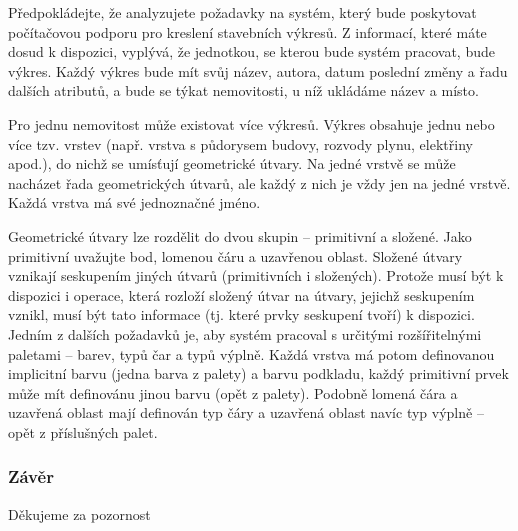 \documentclass{beamer}
\begin{document}
  \begin{frame}
      \scriptsize{
      \hspace{0.5cm}Předpokládejte, že analyzujete požadavky na systém, který bude poskytovat počítačovou
      podporu pro kreslení stavebních výkresů. Z informací, které máte dosud k dispozici,
      vyplývá, že jednotkou, se kterou bude systém pracovat, bude \colorbox{blue!30}{výkres}. Každý výkres bude
      mít svůj \colorbox{red!30}{název, autora, datum poslední změny} a řadu dalších atributů, a bude se týkat
      \colorbox{blue!30}{nemovitosti}, u níž ukládáme \colorbox{red!30}{název a místo}.\par


      \hspace{0.5cm}Pro jednu nemovitost může existovat více výkresů. Výkres obsahuje jednu nebo více tzv.
      \colorbox{blue!30}{vrstev} (např. vrstva s půdorysem budovy, rozvody plynu, elektřiny apod.), do nichž se
      umísťují geometrické útvary. Na jedné vrstvě se může nacházet řada \colorbox{blue!30}{geometrických útvarů},
      ale každý z nich je vždy jen na jedné vrstvě. Každá vrstva má své \colorbox{red!30}{jednoznačné jméno}.\par


      \hspace{0.5cm}Geometrické útvary lze rozdělit do dvou skupin -- \colorbox{blue!30}{primitivní} a \colorbox{blue!30}{složené}. Jako primitivní
      uvažujte bod, lomenou čáru a uzavřenou oblast. Složené útvary vznikají seskupením jiných
      útvarů (primitivních i složených). Protože musí být k dispozici i operace, která rozloží
      složený útvar na útvary, jejichž seskupením vznikl, musí být tato informace (tj. které
      prvky seskupení tvoří) k dispozici. Jedním z dalších požadavků je, aby systém pracoval
      s určitými rozšířitelnými \colorbox{blue!30}{paletami} -- barev, typů čar a typů výplně. Každá vrstva má
      potom definovanou \colorbox{red!30}{implicitní barvu} (jedna barva  z  palety) a barvu podkladu, každý
      primitivní prvek může mít definovánu jinou barvu (opět z palety). Podobně lomená čára
      a uzavřená oblast mají definován typ čáry a uzavřená oblast navíc typ výplně – opět
      z příslušných palet.\par}
  \end{frame}
  \begin{frame}
    \frametitle{Závěr}
    \begin{center}
      Děkujeme za pozornost
    \end{center}
  \end{frame}
\end{document}
